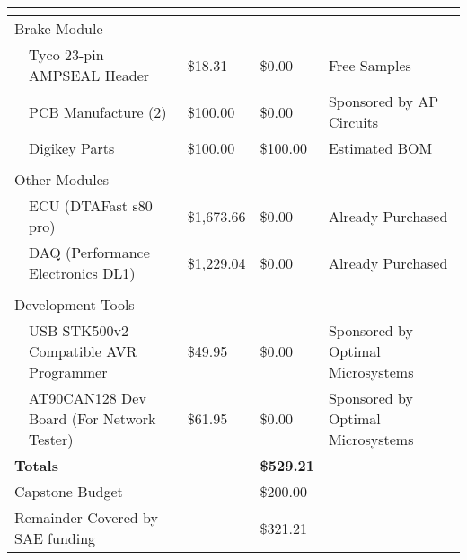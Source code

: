 \begin{scriptsize}
\begin{tabular}{|l|>{\raggedright}p{}|l|l|>{\raggedright}p{}|}
    \hline 
    \multicolumn{1}{|l}{} & \multicolumn{1}{>{\raggedright}p{0.35\columnwidth}}{} & \multicolumn{1}{l}{} & \multicolumn{1}{l}{} & \tabularnewline
    \hline 
    \multicolumn{2}{|l|}{Brake Module} &  &  & \tabularnewline
    \hline 
    & Tyco 23-pin AMPSEAL Header & \$18.31 & \$0.00 & Free Samples\tabularnewline
    \hline 
    & PCB Manufacture (2) & \$100.00 & \$0.00 & Sponsored by AP Circuits\tabularnewline
    \hline 
    & Digikey Parts & \$100.00 & \$100.00 & Estimated BOM\tabularnewline
    \hline 
    \multicolumn{1}{|l}{} & \multicolumn{1}{>{\raggedright}p{0.35\columnwidth}}{} & \multicolumn{1}{l}{} & \multicolumn{1}{l}{} & \tabularnewline
    \hline 
    \multicolumn{2}{|l|}{Other Modules} &  &  & \tabularnewline
    \hline 
    & ECU (DTAFast s80 pro) & \$1,673.66 & \$0.00 & Already Purchased\tabularnewline
    \hline 
    & DAQ (Performance Electronics DL1) & \$1,229.04 & \$0.00 & Already Purchased\tabularnewline
    \hline 
    \multicolumn{1}{|l}{} & \multicolumn{1}{>{\raggedright}p{0.35\columnwidth}}{} & \multicolumn{1}{l}{} & \multicolumn{1}{l}{} & \tabularnewline
    \hline 
    \multicolumn{2}{|l|}{Development Tools} &  &  & \tabularnewline
    \hline 
    & USB STK500v2 Compatible AVR Programmer & \$49.95 & \$0.00 & Sponsored by Optimal Microsystems\tabularnewline
    \hline 
    & AT90CAN128 Dev Board (For Network Tester) & \$61.95 & \$0.00 & Sponsored by Optimal Microsystems\tabularnewline
    \hline
    \hline 
    \multicolumn{2}{|l}{\textbf{Totals}} & \multicolumn{1}{l}{\textbf{\$4,469.88} } & \multicolumn{1}{l}{\textbf{\$529.21} } & \tabularnewline
    \hline
    \multicolumn{2}{|l}{Capstone Budget} & \multicolumn{1}{l}{} & \multicolumn{1}{l}{\$200.00} & \tabularnewline
    \hline 
    \multicolumn{2}{|l}{Remainder Covered by SAE funding} & \multicolumn{1}{l}{} & \multicolumn{1}{l}{\$321.21} & \tabularnewline
    \hline
  \end{tabular}
\end{scriptsize}